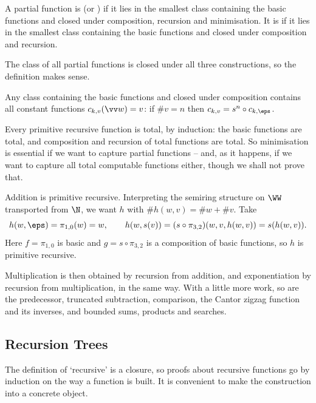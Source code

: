 \begin{definition}
	A partial function is  (or ) if it lies in the smallest class containing the basic functions and closed under composition, recursion and minimisation. It is  if it lies in the smallest class containing the basic functions and closed under composition and recursion.
\end{definition}

The class of all partial functions is closed under all three constructions, so the definition makes sense.

\begin{remark}
	Any class containing the basic functions and closed under composition contains all constant functions $c_{k,v}(\vv w) = v$: if $\#v = n$ then $c_{k,v} = s^n \circ c_{k,\eps}$.
\end{remark}

Every primitive recursive function is total, by induction: the basic functions are total, and composition and recursion of total functions are total. So minimisation is essential if we want to capture partial functions -- and, as it happens, if we want to capture all total computable functions either, though we shall not prove that.

\begin{example}\label{ex:addition}
	Addition is primitive recursive. Interpreting the semiring structure on $\WW$ transported from $\N$, we want $h$ with $\#h(w,v) = \#w + \#v$. Take
	$$h(w,\eps) = \pi_{1,0}(w) = w, \qquad h(w,s(v)) = (s\circ\pi_{3,2})(w,v,h(w,v)) = s(h(w,v)).$$
	Here $f = \pi_{1,0}$ is basic and $g = s \circ \pi_{3,2}$ is a composition of basic functions, so $h$ is primitive recursive.

	Multiplication is then obtained by recursion from addition, and exponentiation by recursion from multiplication, in the same way. With a little more work, so are the predecessor, truncated subtraction, comparison, the Cantor zigzag function and its inverses, and bounded sums, products and searches.
\end{example}

\subsection{Recursion Trees}

The definition of `recursive' is a closure, so proofs about recursive functions go by induction on the way a function is built. It is convenient to make the construction into a concrete object.

